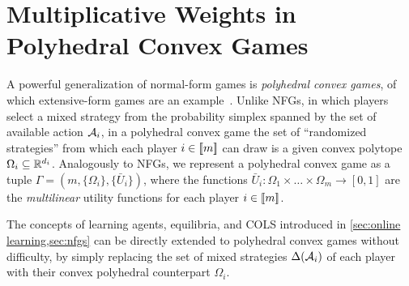 \section{Multiplicative Weights in Polyhedral Convex Games}
\label{sec:vertex}

A powerful generalization of normal-form games is \emph{polyhedral convex games}, of which extensive-form games are an example~\citep{Gordon08:No}. Unlike NFGs, in which players select a mixed strategy from the probability simplex spanned by the set of available action ${\mathcal{A}}_i$, in a polyhedral convex game the set of  ``randomized strategies'' from which each player $i\in[\![m]\!]$ can draw is a given convex polytope $\Omega_i \subseteq {\mathbb{R}}^{d_i}$. Analogously to NFGs, we represent a polyhedral convex game as a tuple $\Gamma = (m, \{\Omega_i\}, \{\bar U_i\})$, where the functions $\bar U_i : \Omega_1\times\dots\times\Omega_m \to [0,1]$ are the \emph{multilinear} utility functions for each player $i\in[\![m]\!]$.

The concepts of learning agents, equilibria, and COLS introduced in \cref{sec:online learning,sec:nfgs} can be directly extended to polyhedral convex games without difficulty, by simply replacing the set of mixed strategies $\Delta({\mathcal{A}}_i)$ of each player with their convex polyhedral counterpart $\Omega_i$.

